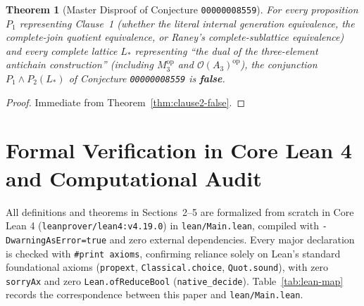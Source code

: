 \documentclass[11pt,a4paper]{article}
\theoremstyle{plain}
\newtheorem{theorem}{Theorem}[section]
\theoremstyle{definition}
\newcommand{\op}{\mathrm{op}}
\newcommand{\Down}{\mathcal{O}}
\begin{document}
\begin{theorem}[Master Disproof of Conjecture \texttt{00000008559}]
\label{thm:master-disproof}
For every proposition $P_1$ representing Clause~1 (whether the literal internal generation
equivalence, the complete-join quotient equivalence, or Raney's complete-sublattice
equivalence) and every complete lattice $L_*$ representing ``the dual of the three-element
antichain construction'' (including $M_3^{\op}$ and $\Down(A_3)^{\op}$), the conjunction
$P_1 \wedge P_2(L_*)$ of Conjecture \texttt{00000008559} is \textbf{false}.
\end{theorem}

\begin{proof}
Immediate from Theorem~\ref{thm:clause2-false}.
\end{proof}

\section{Formal Verification in Core Lean 4 and Computational Audit}

All definitions and theorems in Sections~2--5 are formalized from scratch in Core Lean 4
(\texttt{leanprover/lean4:v4.19.0}) in \texttt{lean/Main.lean}, compiled with
\texttt{-DwarningAsError=true} and zero external dependencies. Every major declaration is
checked with \texttt{\#print axioms}, confirming reliance solely on Lean's standard
foundational axioms (\texttt{propext}, \texttt{Classical.choice}, \texttt{Quot.sound}),
with zero \texttt{sorryAx} and zero \texttt{Lean.ofReduceBool} (\texttt{native\_decide}).
Table~\ref{tab:lean-map} records the correspondence between this paper and \texttt{lean/Main.lean}.
\end{document}
